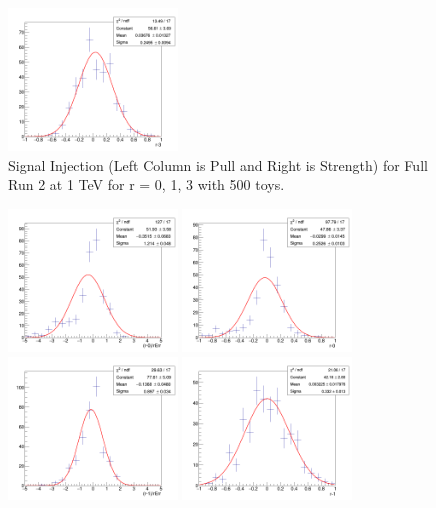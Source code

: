 \begin{figure}[!htb]
	\includegraphics[width=0.4\textwidth]{Figures/signalInjection3_500_sigstrength_1000.png}
	\caption{Signal Injection (Left Column is Pull and Right is Strength) for Full Run 2 at 1 TeV for r = 0, 1, 3 with 500 toys.}
	\label{fig:signalInjection1000plot}
\end{figure}

\begin{figure}[!htb]
	\centering
	\includegraphics[width=0.4\textwidth]{Figures/signalInjection0_500_sigpull_2000.png}
	\includegraphics[width=0.4\textwidth]{Figures/signalInjection0_500_sigstrength_2000.png}
	\includegraphics[width=0.4\textwidth]{Figures/signalInjection1_500_sigpull_2000.png}
	\includegraphics[width=0.4\textwidth]{Figures/signalInjection1_500_sigstrength_2000.png}

\end{figure}
